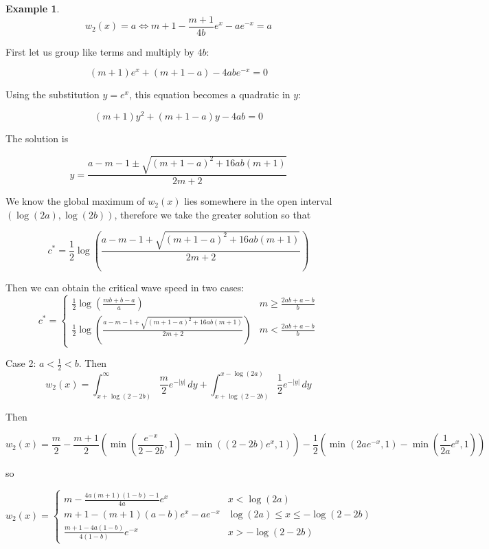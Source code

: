 \documentclass[11pt]{article}
\theoremstyle{definition}
\newtheorem{ex}[thm]{Example}
\numberwithin{equation}{section}
\numberwithin{thm}{section}
\begin{document}
\begin{ex}
$$ w_2(x)=a \iff m + 1 - \frac{m+1}{4b} e^x - ae^{-x} = a $$

First let us group like terms and multiply by $4b$:

$$ (m+1) e^x + (m + 1 - a) - 4abe^{-x} = 0 $$

Using the substitution $y=e^x$, this equation becomes a quadratic in $y$:

$$ (m+1) y^2 + (m + 1 - a) y - 4ab = 0 $$

The solution is

$$ y = \frac{a-m-1 \pm \sqrt{(m+1-a)^2 + 16ab(m+1)}}{2m+2}$$

We know the global maximum of $w_2(x)$ lies somewhere in the open interval $(\log(2a),\log(2b))$, therefore we take the greater solution so that

$$ c^* = \frac{1}{2} \log\left(  \frac{a-m-1 + \sqrt{(m+1-a)^2 + 16ab(m+1)}}{2m+2} \right) $$

Then we can obtain the critical wave speed in two cases:
$$ c^* = \begin{cases} \displaystyle
\frac{1}{2} \log \left( \frac{mb+b-a}{a} \right) & m \geq \frac{2ab+a-b}{b} \\
\displaystyle
 \frac{1}{2} \log\left(  \frac{a-m-1 + \sqrt{(m+1-a)^2 + 16ab(m+1)}}{2m+2} \right) & m < \frac{2ab+a-b}{b}
\end{cases} $$

Case 2: $a<\frac{1}{2}<b$. Then
$$ w_2(x) = \int_{x+\log(2-2b)}^{\infty} \frac{m}{2}e^{-|y|}\,dy + \int_{x+\log(2-2b)}^{x-\log(2a)} \frac{1}{2}e^{-|y|} \,dy $$

Then

$$ w_2(x) = \frac{m}{2} - \frac{m+1}{2}\left( \min(\frac{e^{-x}}{2-2b},1) - \min((2-2b)e^{x},1) \right) - \frac{1}{2} \left( \min(2ae^{-x},1) - \min(\frac{1}{2a}e^{x},1) \right) $$

so

$$ w_2(x) = \begin{cases}
\displaystyle
m - \frac{4a(m+1)(1-b)-1}{4a} e^x & x <\log(2a) \\
\displaystyle
m+1 - (m+1)(a-b) e^x - ae^{-x} & \log(2a) \leq x \leq -\log(2-2b) \\
\displaystyle
\frac{m+1-4a(1-b)}{4(1-b)} e^{-x}  & x > -\log(2-2b)
\end{cases} $$

\end{ex}
\end{document}

